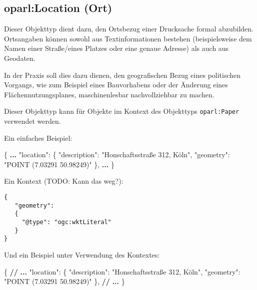 \documentclass[,a4paper]{article}
\newenvironment{Shaded}{}{}
\newcommand{\DataTypeTok}[1]{\textcolor[rgb]{0.56,0.13,0.00}{{#1}}}
\newcommand{\StringTok}[1]{\textcolor[rgb]{0.25,0.44,0.63}{{#1}}}
\newcommand{\FunctionTok}[1]{\textcolor[rgb]{0.02,0.16,0.49}{{#1}}}
\newcommand{\ErrorTok}[1]{\textcolor[rgb]{1.00,0.00,0.00}{\textbf{{#1}}}}
\begin{document}
\subsection{oparl:Location (Ort)}\label{oparlux5flocation}

Dieser Objekttyp dient dazu, den Ortsbezug einer Drucksache formal
abzubilden. Ortsangaben können sowohl aus Textinformationen bestehen
(beispielsweise dem Namen einer Straße/eines Platzes oder eine genaue
Adresse) als auch aus Geodaten.

In der Praxis soll dies dazu dienen, den geografischen Bezug eines
politischen Vorgangs, wie zum Beispiel eines Bauvorhabens oder der
Änderung eines Flächennutzungsplanes, maschinenlesbar nachvollziehbar zu
machen.

Dieser Objekttyp kann für Objekte im Kontext des Objekttyps
\texttt{oparl:Paper} verwendet werden.

Ein einfaches Beispiel:

\begin{Shaded}
\begin{Highlighting}[]
\FunctionTok{\{}
    \ErrorTok{...}
    \DataTypeTok{"location"}\FunctionTok{:} \FunctionTok{\{}
        \DataTypeTok{"description"}\FunctionTok{:} \StringTok{"Honschaftsstraße 312, Köln"}\FunctionTok{,}
        \DataTypeTok{"geometry"}\FunctionTok{:} \StringTok{"POINT (7.03291 50.98249)"}
    \FunctionTok{\},}
    \ErrorTok{...}
\FunctionTok{\}}
\end{Highlighting}
\end{Shaded}

Ein Kontext (TODO: Kann das weg?):

\begin{verbatim}
{
   "geometry":
   {
     "@type": "ogc:wktLiteral" 
   }
}
\end{verbatim}

Und ein Beispiel unter Verwendung des Kontextes:

\begin{Shaded}
\begin{Highlighting}[]
\FunctionTok{\{}
    \ErrorTok{//} \ErrorTok{...}
    \DataTypeTok{"location"}\FunctionTok{:} \FunctionTok{\{}
        \DataTypeTok{"description"}\FunctionTok{:} \StringTok{"Honschaftsstraße 312, Köln"}\FunctionTok{,}
        \DataTypeTok{"geometry"}\FunctionTok{:} \StringTok{"POINT (7.03291 50.98249)"}
    \FunctionTok{\},}
    \ErrorTok{//} \ErrorTok{...}
\FunctionTok{\}}
\end{Highlighting}
\end{Shaded}
\end{document}
